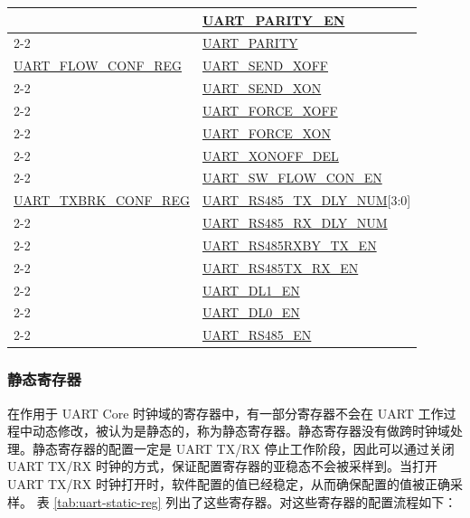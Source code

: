\documentclass[main\_\_CN.tex]{subfiles}
\begin{document}
\begin{longtable}[c]{|p{6cm}|p{6cm}|}
 & \hyperref[fielddesc:UARTPARITYEN]{UART\_PARITY\_EN} \\\cline{2-2} 
 & \hyperref[fielddesc:UARTPARITY]{UART\_PARITY} \\\hline
\hyperref[regdesc:UARTFLOWCONFREG]{UART\_FLOW\_CONF\_REG}  & \hyperref[fielddesc:UARTSENDXOFF]{UART\_SEND\_XOFF} \\\cline{2-2} 
 & \hyperref[fielddesc:UARTSENDXON]{UART\_SEND\_XON} \\\cline{2-2} 
 & \hyperref[fielddesc:UARTFORCEXOFF]{UART\_FORCE\_XOFF} \\\cline{2-2} 
 & \hyperref[fielddesc:UARTFORCEXON]{UART\_FORCE\_XON} \\\cline{2-2} 
 & \hyperref[fielddesc:UARTXONOFFDEL]{UART\_XONOFF\_DEL} \\\cline{2-2} 
 & \hyperref[fielddesc:UARTSWFLOWCONEN]{UART\_SW\_FLOW\_CON\_EN} \\\hline
\hyperref[regdesc:UARTTXBRKCONFREG]{UART\_TXBRK\_CONF\_REG} & \hyperref[fielddesc:UARTRS485TXDLYNUM]{UART\_RS485\_TX\_DLY\_NUM}[3:0] \\\cline{2-2} 
 & \hyperref[fielddesc:UARTRS485RXDLYNUM]{UART\_RS485\_RX\_DLY\_NUM} \\\cline{2-2} 
 & \hyperref[fielddesc:UARTRS485RXBYTXEN]{UART\_RS485RXBY\_TX\_EN} \\\cline{2-2} 
 & \hyperref[fielddesc:UARTRS485TXRXEN]{UART\_RS485TX\_RX\_EN} \\\cline{2-2} 
 & \hyperref[fielddesc:UARTDL1EN]{UART\_DL1\_EN} \\\cline{2-2} 
 & \hyperref[fielddesc:UARTDL0EN]{UART\_DL0\_EN} \\\cline{2-2} 
 & \hyperref[fielddesc:UARTRS485EN]{UART\_RS485\_EN} \\\hline
\end{longtable}


\subsubsection{静态寄存器}\label{sec:uart-static-reg}

在作用于 UART Core 时钟域的寄存器中，有一部分寄存器不会在 UART 工作过程中动态修改，被认为是静态的，称为静态寄存器。静态寄存器没有做跨时钟域处理。静态寄存器的配置一定是 UART TX/RX 停止工作阶段，因此可以通过关闭 UART TX/RX 时钟的方式，保证配置寄存器的亚稳态不会被采样到。当打开 UART TX/RX 时钟打开时，软件配置的值已经稳定，从而确保配置的值被正确采样。
表 \ref{tab:uart-static-reg} 列出了这些寄存器。对这些寄存器的配置流程如下：
\end{document}
